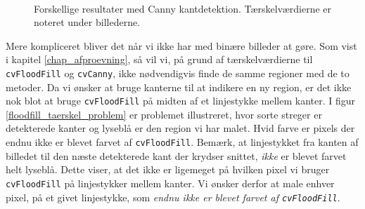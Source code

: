 {\begin{figure}[!p]
    \\
    \hspace{1em}
    \caption[]{Forskellige resultater med Canny kantdetektion.
    Tærskelværdierne er noteret under billederne.}
    \label{region_extract}
\end{figure}

Mere kompliceret bliver det når vi ikke har med binære billeder at gøre.
Som vist i kapitel \ref{chap_afproevning}, så vil vi, på grund af
tærskelværdierne til \texttt{cvFloodFill} og \texttt{cvCanny}, ikke
nødvendigvis finde de samme regioner med de to metoder. Da vi ønsker at
bruge kanterne til at indikere en ny region, er det ikke nok blot at
bruge \texttt{cvFloodFill} på midten af et linjestykke mellem kanter. I
figur \ref{floodfill_taerskel_problem} er problemet illustreret, hvor
sorte streger er detekterede kanter og lyseblå er den region vi har
malet. Hvid farve er pixels der endnu ikke er blevet farvet af
\texttt{cvFloodFill}.  Bemærk, at linjestykket fra kanten af billedet
til den næste detekterede kant der krydser snittet, \emph{ikke} er
blevet farvet helt lyseblå.  Dette viser, at det ikke er ligemeget på
hvilken pixel vi bruger \texttt{cvFloodFill} på linjestykker mellem
kanter. Vi ønsker derfor at male enhver pixel, på et givet linjestykke,
som \emph{endnu ikke er blevet farvet af \texttt{cvFloodFill}}.

}

